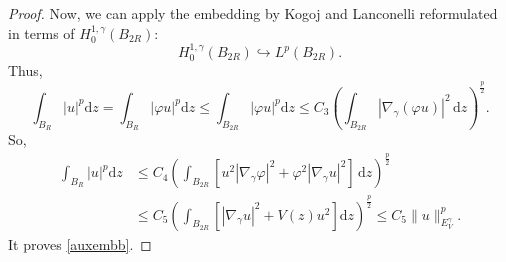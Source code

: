 \documentclass[12pt]{amsart}
\begin{document}
\begin{proof}
Now, we can apply the embedding by Kogoj and Lanconelli \cite[Theorem 3.3]{Kogoj-Lan-12} reformulated in terms of $H_0^{1,\gamma}(B_{2R})$:
\begin{equation}
H_0^{1,\gamma}(B_{2R}) \hookrightarrow L^p(B_{2R}).
\end{equation}
Thus,
\begin{equation}\label{Lp-ball-u-phi}
    \int_{B_R}|u|^p \mathrm{d}z = \int_{B_{R}}|\varphi u|^p \mathrm{d}z \leq \int_{B_{2R}}|\varphi u|^p \mathrm{d}z \leq C_3 \left(\int_{B_{2R}} |\nabla_\gamma(\varphi u)|^2 \,\mathrm{d}z \right)^{\frac{p}{2}}.
\end{equation}
So,
\begin{equation}\label{est-varphi}
\begin{aligned}
    \int_{B_R}|u|^p \mathrm{d}z & \leq C_4 \left(\int_{B_{2R}} \left[u^2\left|\nabla_\gamma \varphi\right|^2+\varphi^2\left|\nabla_\gamma u\right|^2\right] \, \mathrm{d}z \right)^{\frac{p}{2}}
    \\
    &\leq C_5 \left(\int_{B_{2R}}\left[\left|\nabla_\gamma u\right|^2 + V(z) u^2\right] \mathrm{d}z \right)^{\frac{p}{2}}  \leq C_5\|u\|_{E_V^\gamma}^p.
\end{aligned}    
\end{equation}
It proves \eqref{auxembb}.
\end{proof}
\end{document}
